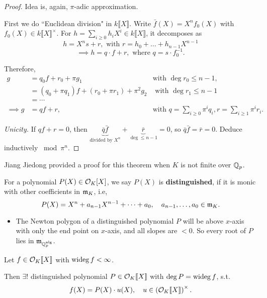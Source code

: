 \begin{proof}
    Idea is, again, $\pi$-adic approximation.
    
    First we do ``Euclidean division" in $k\llbracket X \rrbracket $.
    Write $\bar f(X) = X^nf_0(X)$ with $f_0(X)\in k\llbracket X \rrbracket^\times$.
    For $ h = \sum_{i\ge 0}h_iX^i\in k\llbracket X \rrbracket$,
    it decomposes as\[h = X^ns + r,\text{  with } r = h_0 + \dots + h_{n-1}X^{n-1}\]
    \[\implies h = q\cdot f + r, \text{  where } q = s\cdot f_0^{-1}.\]

    Therefore,\begin{align*}
        g &= q_0f + r_0 + \pi g_1 &\text{with } \deg r_0 \le n-1,\\
        &= (q_0 + \pi q_1)f + (r_0 + \pi r_1) + \pi^2 g_2 &\text{ with }\deg r_1\le n - 1\\
        &=\cdots & \\
    \implies g &= qf + r, &\text{with } q = \sum_{i\ge 0}\pi^iq_i, r = \sum_{i\ge 1}\pi^ir_i.
    \end{align*}

    \textit{Unicity.}
    If $qf + r = 0$, then $\underbrace{\bar{q}\bar{f}}_{\text{divided by }X^n} + \underbrace{\bar{r}}_{\deg\le n - 1} = 0$, so $\bar{q}\bar{f} = \bar{r} = 0$.
    Deduce inductively $\bmod \pi^n$.
\end{proof}
\begin{remark}
    Jiang Jiedong provided a proof for this theorem when $K$ is not finite over $\mathbb{Q}_p$.
\end{remark}

For a polynomial $P(X)\in \mathcal{O}_K[X]$, we say $P(X)$ is \textbf{distinguished}, if it is monic with other coefficients in $\mathfrak{m}_K$, i.e, \[P(X) = X^n + a_{n-1}X^{n-1} + \dots + a_0,\quad a_{n-1},\dots, a_0\in\mathfrak{m}_{K}.\]
\begin{itemize}
    \item The Newton polygon of a distinguished polynomial $P$ will be above $x$-axis with only the end point on $x$-axis, and all slopes are $ < 0$. So every root of $P$ lies in $\mathfrak{m}_{\mathbb{Q}_p^{\mathrm{alg}}}$.
\end{itemize}

\begin{theorem}\label{Weierstrass preparation}
    Let $f\in\mathcal{O}_K \llbracket X \rrbracket$ with $\operatorname{wideg} f < \infty$.\par
    Then $\exists !$ distinguished polynomial $P\in\mathcal{O}_K \llbracket X \rrbracket$ with $\deg P = \operatorname{wideg} f$, s.t. \[f(X) = P(X)\cdot u(X),\quad u\in\left( \mathcal{O}_K\llbracket X \rrbracket \right)^\times.\]
\end{theorem}

